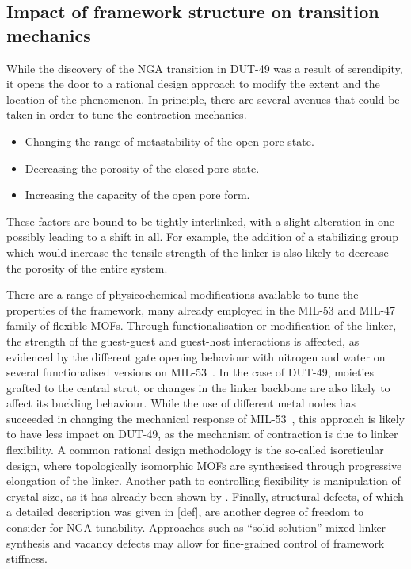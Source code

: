 
\subsection{Impact of framework structure on transition mechanics}%
\label{dut:comparison}

While the discovery of the \gls{NGA} transition in DUT-49 was a result 
of serendipity, it opens the door to a rational design approach 
to modify the extent and the location of the phenomenon. In principle,
there are several avenues that could be taken in order to tune the 
contraction mechanics.
\begin{itemize}
    \item Changing the range of metastability of the open pore state.
    \item Decreasing the porosity of the closed pore state.
    \item Increasing the capacity of the open pore form.
\end{itemize}
These factors are bound to be tightly interlinked, with a slight 
alteration in one possibly leading to a shift in all. For example, the 
addition of a stabilizing group which would increase the tensile 
strength of the linker is also likely to decrease the porosity 
of the entire system.

There are a range of physicochemical modifications available to 
tune the properties of the framework, many already employed in the
MIL-53 and MIL-47 family of flexible \glspl{MOF}.
Through functionalisation or modification of the linker, the 
strength of the guest-guest
and guest-host interactions is affected, as evidenced by the different
gate opening behaviour with nitrogen and water on several functionalised
versions on MIL-53~\cite{biswasNewFunctionalizedFlexible2011}.
In the case of DUT-49, moieties grafted to the central strut, or changes
in the linker backbone are also likely to affect its buckling behaviour.
While the use of different metal nodes has succeeded in
changing the mechanical response of 
MIL-53~\cite{yotImpactMetalCentre2016}, this 
approach is likely to have less impact on DUT-49, as the mechanism of 
contraction is due to linker flexibility.
A common rational design methodology is the so-called isoreticular design,
where topologically isomorphic \glspl{MOF} are synthesised 
through progressive elongation
of the linker. Another path to controlling flexibility is
manipulation of crystal size, as it has already been shown 
by \citet{krauseEffectCrystalliteSize2018}.
Finally, structural defects, of which a detailed description was given 
in \autoref{def}, are another degree of freedom to consider for \gls{NGA} 
tunability. Approaches such as ``solid solution'' mixed linker synthesis
and vacancy defects may allow for fine-grained control of framework stiffness.

